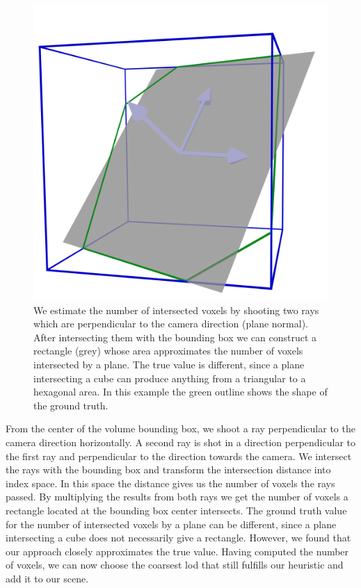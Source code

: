 \begin{figure}[t]
    \centering
    \includegraphics[width=0.3\linewidth]{img/voxel_estimation.png}
    \caption[Estimation of intersected voxels]{We estimate the number of intersected voxels by shooting two rays which are perpendicular to the camera direction (plane normal). After intersecting them with the bounding box we can construct a rectangle (grey) whose area approximates the number of voxels intersected by a plane. The true value is different, since a plane intersecting a cube can produce anything from a triangular to a hexagonal area. In this example the green outline shows the shape of the ground truth.}
    \label{fig:voxel_estimation}
\end{figure}
From the center of the volume bounding box, we shoot a ray perpendicular to the camera direction horizontally.
A second ray is shot in a direction perpendicular to the first ray and perpendicular to the direction towards the camera.
We intersect the rays with the bounding box and transform the intersection distance into index space.
In this space the distance gives us the number of voxels the rays passed.
By multiplying the results from both rays we get the number of voxels a rectangle located at the bounding box center intersects.
The ground truth value for the number of intersected voxels by a plane can be different, since a plane intersecting a cube does not necessarily give a rectangle.
However, we found that our approach closely approximates the true value.
Having computed the number of voxels, we can now choose the coarsest \ac{lod} that still fulfills our heuristic and add it to our scene.

